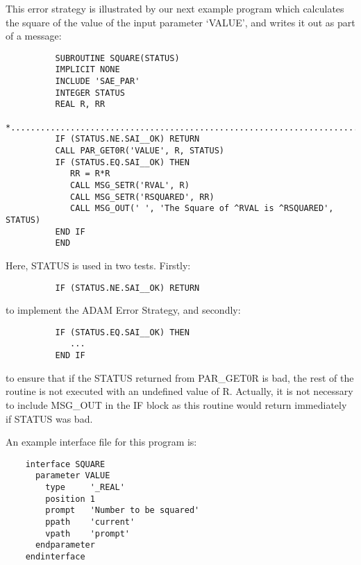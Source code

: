 This error strategy is illustrated by our next example program which calculates
the square of the value of the input parameter `VALUE', and writes it out as
part of a message:

\begin{small}
\begin{verbatim}
          SUBROUTINE SQUARE(STATUS)
          IMPLICIT NONE
          INCLUDE 'SAE_PAR'
          INTEGER STATUS
          REAL R, RR
    *...........................................................................
          IF (STATUS.NE.SAI__OK) RETURN
          CALL PAR_GET0R('VALUE', R, STATUS)                        
          IF (STATUS.EQ.SAI__OK) THEN
             RR = R*R           
             CALL MSG_SETR('RVAL', R)
             CALL MSG_SETR('RSQUARED', RR)
             CALL MSG_OUT(' ', 'The Square of ^RVAL is ^RSQUARED', STATUS)
          END IF
          END
\end{verbatim}
\end{small}
                                               
Here, STATUS is used in two tests.
Firstly:

\begin{small}
\begin{verbatim}
          IF (STATUS.NE.SAI__OK) RETURN
\end{verbatim}
\end{small}
                                               
to implement the ADAM Error Strategy, and secondly:

\begin{small}
\begin{verbatim}
          IF (STATUS.EQ.SAI__OK) THEN
             ...
          END IF
\end{verbatim}
\end{small}
                                               
to ensure that if the STATUS returned from PAR\_GET0R is bad, the rest of the
routine is not executed with an undefined value of R.
Actually, it is not necessary to include MSG\_OUT in the IF block as this
routine would return immediately if STATUS was bad.                  

An example interface file for this program is:

\begin{small}
\begin{verbatim}
    interface SQUARE
      parameter VALUE
        type     '_REAL'
        position 1
        prompt   'Number to be squared'
        ppath    'current'
        vpath    'prompt'
      endparameter
    endinterface
\end{verbatim}
\end{small}

